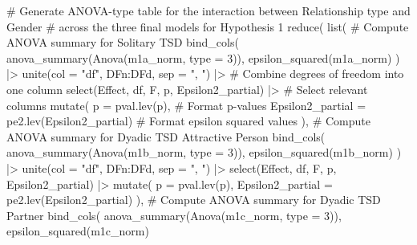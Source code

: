 \documentclass[
  bookmarksnumbered]{article}
\newenvironment{Shaded}{\begin{snugshade}}{\end{snugshade}}
\newcommand{\AttributeTok}[1]{\textcolor[rgb]{0.80,0.80,0.80}{#1}}
\newcommand{\CommentTok}[1]{\textcolor[rgb]{0.50,0.62,0.50}{#1}}
\newcommand{\DecValTok}[1]{\textcolor[rgb]{0.86,0.86,0.80}{#1}}
\newcommand{\FunctionTok}[1]{\textcolor[rgb]{0.94,0.94,0.56}{#1}}
\newcommand{\NormalTok}[1]{\textcolor[rgb]{0.80,0.80,0.80}{#1}}
\newcommand{\SpecialCharTok}[1]{\textcolor[rgb]{0.86,0.64,0.64}{#1}}
\newcommand{\StringTok}[1]{\textcolor[rgb]{0.80,0.58,0.58}{#1}}
\begin{document}
\begin{Shaded}
\begin{Highlighting}[]
\CommentTok{\# Generate ANOVA{-}type table for the interaction between Relationship type and Gender}
\CommentTok{\# across the three final models for Hypothesis 1}
\FunctionTok{reduce}\NormalTok{(}
  \FunctionTok{list}\NormalTok{(}
    \CommentTok{\# Compute ANOVA summary for Solitary TSD}
    \FunctionTok{bind\_cols}\NormalTok{(}
      \FunctionTok{anova\_summary}\NormalTok{(}\FunctionTok{Anova}\NormalTok{(m1a\_norm, }\AttributeTok{type =} \DecValTok{3}\NormalTok{)),}
      \FunctionTok{epsilon\_squared}\NormalTok{(m1a\_norm)}
\NormalTok{    ) }\SpecialCharTok{|\textgreater{}}
      \FunctionTok{unite}\NormalTok{(}\AttributeTok{col =} \StringTok{"df"}\NormalTok{, DFn}\SpecialCharTok{:}\NormalTok{DFd, }\AttributeTok{sep =} \StringTok{", "}\NormalTok{) }\SpecialCharTok{|\textgreater{}} \CommentTok{\# Combine degrees of freedom into one column}
      \FunctionTok{select}\NormalTok{(Effect, df, F, p, Epsilon2\_partial) }\SpecialCharTok{|\textgreater{}} \CommentTok{\# Select relevant columns}
      \FunctionTok{mutate}\NormalTok{(}
        \AttributeTok{p =} \FunctionTok{pval.lev}\NormalTok{(p), }\CommentTok{\# Format p{-}values}
        \AttributeTok{Epsilon2\_partial =} \FunctionTok{pe2.lev}\NormalTok{(Epsilon2\_partial) }\CommentTok{\# Format epsilon squared values}
\NormalTok{      ),}
    \CommentTok{\# Compute ANOVA summary for Dyadic TSD Attractive Person}
    \FunctionTok{bind\_cols}\NormalTok{(}
      \FunctionTok{anova\_summary}\NormalTok{(}\FunctionTok{Anova}\NormalTok{(m1b\_norm, }\AttributeTok{type =} \DecValTok{3}\NormalTok{)),}
      \FunctionTok{epsilon\_squared}\NormalTok{(m1b\_norm)}
\NormalTok{    ) }\SpecialCharTok{|\textgreater{}}
      \FunctionTok{unite}\NormalTok{(}\AttributeTok{col =} \StringTok{"df"}\NormalTok{, DFn}\SpecialCharTok{:}\NormalTok{DFd, }\AttributeTok{sep =} \StringTok{", "}\NormalTok{) }\SpecialCharTok{|\textgreater{}}
      \FunctionTok{select}\NormalTok{(Effect, df, F, p, Epsilon2\_partial) }\SpecialCharTok{|\textgreater{}}
      \FunctionTok{mutate}\NormalTok{(}
        \AttributeTok{p =} \FunctionTok{pval.lev}\NormalTok{(p),}
        \AttributeTok{Epsilon2\_partial =} \FunctionTok{pe2.lev}\NormalTok{(Epsilon2\_partial)}
\NormalTok{      ),}
    \CommentTok{\# Compute ANOVA summary for Dyadic TSD Partner}
    \FunctionTok{bind\_cols}\NormalTok{(}
      \FunctionTok{anova\_summary}\NormalTok{(}\FunctionTok{Anova}\NormalTok{(m1c\_norm, }\AttributeTok{type =} \DecValTok{3}\NormalTok{)),}
      \FunctionTok{epsilon\_squared}\NormalTok{(m1c\_norm)}

\end{Highlighting}
\end{Shaded}
\end{document}
